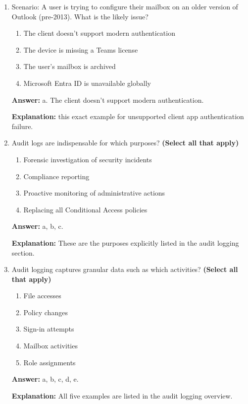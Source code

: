 \documentclass[10pt]{article}
\begin{document}
\begin{enumerate}[leftmargin=*]
\textbf{Explanation:} These are the exact investigative steps listed in the documentation.

\item Scenario: A user is trying to configure their mailbox on an older version of Outlook (pre-2013). What is the likely issue?
\begin{enumerate}[label=\alph*., leftmargin=1.5em]
\item The client doesn’t support modern authentication
\item The device is missing a Teams license
\item The user’s mailbox is archived
\item Microsoft Entra ID is unavailable globally
\end{enumerate}
\textbf{Answer:} a. The client doesn’t support modern authentication.

\textbf{Explanation:} this exact example for unsupported client app authentication failure.

\item Audit logs are indispensable for which purposes? \textbf{(Select all that apply)}
\begin{enumerate}[label=\alph*., leftmargin=1.5em]
\item Forensic investigation of security incidents
\item Compliance reporting
\item Proactive monitoring of administrative actions
\item Replacing all Conditional Access policies
\end{enumerate}
\textbf{Answer:} a, b, c.

\textbf{Explanation:} These are the purposes explicitly listed in the audit logging section.

\item Audit logging captures granular data such as which activities? \textbf{(Select all that apply)}
\begin{enumerate}[label=\alph*., leftmargin=1.5em]
\item File accesses
\item Policy changes
\item Sign-in attempts
\item Mailbox activities
\item Role assignments
\end{enumerate}
\textbf{Answer:} a, b, c, d, e.

\textbf{Explanation:} All five examples are listed in the audit logging overview.


\end{enumerate}
\end{document}
